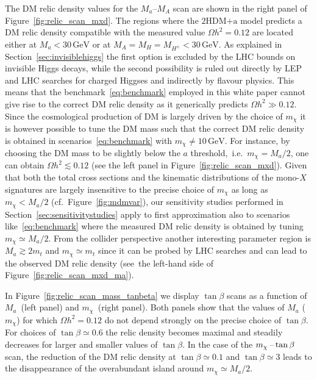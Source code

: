 \documentclass[review]{elsarticle}
\newcommand{\mA}{\ensuremath{M_{A}}\xspace}
\newcommand{\ma}{\ensuremath{M_{a}}\xspace}
\newcommand{\mH}{\ensuremath{M_{H}}\xspace}
\newcommand{\mHc}{\ensuremath{M_{H^{\pm}}}\xspace}
\newcommand{\hdma}{\ensuremath{\textrm{2HDM+a}}\xspace}
\begin{document}
 The DM relic density values for the $\ma$--$\mA$ scan  are shown in the right panel of Figure~\ref{fig:relic_scan_mxd}. The regions where the \hdma model predicts a DM relic density compatible with the measured value $\Omega h^{2} = 0.12$ are located either at $\ma < 30 \, {\mathrm{GeV}}$ or at $\mA=\mH=\mHc < 30 \, {\mathrm{GeV}}$. As explained in Section~\ref{sec:invisiblehiggs} the first option is excluded by the LHC bounds on invisible Higgs decays, while the second possibility is ruled out directly by LEP and LHC searches for charged Higgses and indirectly by flavour physics. This means that the benchmark~\eqref{eq:benchmark} employed in this white paper cannot give rise to the correct DM relic density as it generically predicts $\Omega h^{2} \gg 0.12$.  Since the cosmological production of DM is largely driven by the choice of $m_\chi$ it is however possible to tune the DM mass such that the correct DM relic density is obtained in scenarios~\eqref{eq:benchmark} with $m_\chi \neq 10 \, {\mathrm{GeV}}$.  For instance, by choosing the DM mass to be slightly below the $a$ threshold,~i.e.~$m_\chi = \ma/2$, one can obtain $\Omega h^{2} \lesssim 0.12$ (see the left panel in Figure~\ref{fig:relic_scan_mxd}). Given that both the total cross sections and the kinematic distributions of the mono-$X$ signatures are largely insensitive to the precise choice of $m_\chi$ as long as $m_\chi < \ma/2$ (cf.~Figure~\ref{fig:mdmvar}), our sensitivity studies performed in Section~\ref{sec:sensitivitystudies} apply to first approximation also to scenarios like~\eqref{eq:benchmark} where the measured DM relic density is obtained by tuning $ m_\chi \simeq \ma/2$. From the collider perspective another interesting parameter region is $M_a \gtrsim  2 m_t$ and $m_\chi \simeq m_t$ since it can be probed by LHC searches and can lead to the observed DM relic density (see~the left-hand side of Figure~\ref{fig:relic_scan_mxd_ma}).  

 In Figure~\ref{fig:relic_scan_mass_tanbeta} we display $\tan \beta$ scans as a function of $\ma$~(left panel) and $m_\chi$~(right panel). Both panels show that the values of $\ma$ ($m_\chi$) for which $\Omega h^{2} = 0.12$ do not depend strongly on the precise choice of $\tan \beta$. For choices of $\tan \beta \simeq 0.6$ the relic density becomes maximal and steadily decreases for larger and smaller values of $\tan \beta$. In the case of the $m_\chi \hspace{0.5mm}$--$\hspace{0.5mm} \tan \beta$ scan, the reduction of the DM relic density at $\tan \beta \simeq 0.1$ and $\tan \beta \simeq 3$  leads to the disappearance of the overabundant island around $m_\chi\simeq\ma/2$.
 
\end{document}
